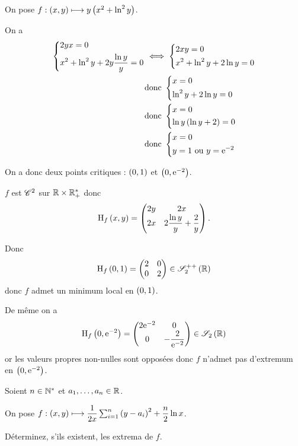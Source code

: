 \begin{corr}
On pose \(f:\left(x,y\right)\longmapsto y\left(x^2+\ln^2y\right)\).

On a \[\begin{aligned}
\begin{dcases}
2yx=0 \\
x^2+\ln^2y+2y\dfrac{\ln y}{y}=0
\end{dcases}&\iff\begin{dcases}
2xy=0 \\
x^2+\ln^2y+2\ln y=0
\end{dcases} \\
&\text{donc }\begin{dcases}
x=0 \\
\ln^2y+2\ln y=0
\end{dcases} \\
&\text{donc }\begin{dcases}
x=0 \\
\ln y\left(\ln y+2\right)=0
\end{dcases} \\
&\text{donc }\begin{dcases}
x=0 \\
y=1\text{ ou }y=\mathrm{e}^{-2}
\end{dcases}
\end{aligned}\]

On a donc deux points critiques : \(\left(0,1\right)\) et \(\left(0,\mathrm{e}^{-2}\right)\).

\(f\) est \(\mathscr{C}^{2}\) sur \(\mathbb{R}\times\mathbb{R}_+^*\) donc \[\operatorname{H}_{f}\left(x,y\right)=\begin{pmatrix}
2y & 2x \\
2x & 2\dfrac{\ln y}{y}+\dfrac{2}{y}
\end{pmatrix}.\]

Donc \[\hessienne{f}\paren{0,1}=\begin{pmatrix}
2 & 0 \\
0 & 2
\end{pmatrix}\in\symdefpos{2}[\R]\] donc \(f\) admet un minimum local en \(\left(0,1\right)\).

De même on a \[\hessienne{f}\paren{0,\e{-2}}=\begin{pmatrix}
2\e{-2} & 0 \\
0 & -\dfrac{2}{\e{-2}}
\end{pmatrix}\in\sym{2}[\R]\] or les valeurs propres non-nulles sont opposées donc \(f\) n'admet pas d'extremum en \(\left(0,\mathrm{e}^{-2}\right)\).
\end{corr}

\begin{exo}
Soient \(n\in\mathbb{N}^*\) et \(a_1,\dots,a_n\in\mathbb{R}\).

On pose \(f:\left(x,y\right)\longmapsto\dfrac{1}{2x}\sum_{i=1}^n\left(y-a_i\right)^2+\dfrac{n}{2}\ln x\).

Déterminez, s'ils existent, les extrema de \(f\).
\end{exo}

